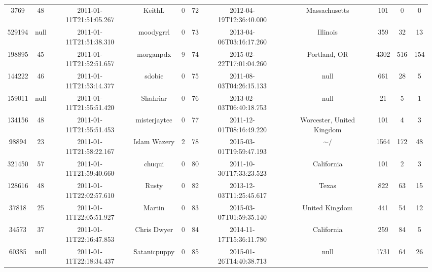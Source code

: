 \documentclass[12pt,a4paper,twoside,openright,titlepage,final]{article}
\begin{document}
\begin{enumerate}
\begin{table}[htbp!]
{\begin{tabular}{@{}ccccccccccc@{}}
			3769      & 48   & 2011-01-11T21:51:05.267 & KeithL                & 0         & 72    & 2012-04-19T12:36:40.000 & Massachusetts                    & 101        & 0       & 0     \\
			529194    & null & 2011-01-11T21:51:38.310 & moodygrrl             & 0         & 73    & 2013-04-06T03:16:17.260 & Illinois                         & 359        & 32      & 13    \\
			198895    & 45   & 2011-01-11T21:52:51.657 & morganpdx             & 9         & 74    & 2015-02-22T17:01:04.260 & Portland, OR                     & 4302       & 516     & 154   \\
			144222    & 46   & 2011-01-11T21:53:14.377 & sdobie                & 0         & 75    & 2011-08-03T04:26:15.133 & null                             & 661        & 28      & 5     \\
			159011    & null & 2011-01-11T21:55:51.420 & Shahriar              & 0         & 76    & 2013-02-03T06:40:18.753 & null                             & 21         & 5       & 1     \\
			134156    & 48   & 2011-01-11T21:55:51.453 & misterjaytee          & 0         & 77    & 2011-12-01T08:16:49.220 & Worcester, United Kingdom        & 101        & 4       & 3     \\
			98894     & 23   & 2011-01-11T21:58:22.167 & Islam Wazery          & 2         & 78    & 2015-03-01T19:59:47.193 & $\sim$/                          & 1564       & 172     & 48    \\
			321450    & 57   & 2011-01-11T21:59:40.660 & chuqui                & 0         & 80    & 2011-10-30T17:33:23.523 & California                       & 101        & 2       & 3     \\
			128616    & 48   & 2011-01-11T22:02:57.610 & Rusty                 & 0         & 82    & 2013-12-03T11:25:45.617 & Texas                            & 822        & 63      & 15    \\
			37818     & 25   & 2011-01-11T22:05:51.927 & Martin                & 0         & 83    & 2015-03-07T01:59:35.140 & United Kingdom                   & 441        & 54      & 12    \\
			34573     & 37   & 2011-01-11T22:16:47.853 & Chris Dwyer           & 0         & 84    & 2014-11-17T15:36:11.780 & California                       & 259        & 84      & 5     \\
			60385     & null & 2011-01-11T22:18:34.437 & Satanicpuppy          & 0         & 85    & 2015-01-26T14:40:38.713 & null                             & 1731       & 64      & 26    \\

\end{tabular}}
\end{table}
\end{enumerate}
\end{document}
